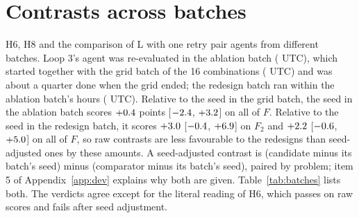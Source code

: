 \section{Contrasts across batches}\label{app:batches}
H6, H8 and the comparison of L with one retry pair agents from different batches. Loop 3's agent was re-evaluated in the
ablation batch (\vbtAbl{} UTC), which started together with the grid batch of the 16 combinations (\vbtGrid{} UTC) and
was about a quarter done when the grid ended; the redesign batch ran within the ablation batch's hours (\vbtRed{} UTC).
Relative to the seed in the grid batch, the seed in the ablation batch scores $+0.4$ points [$-2.4$,
$+3.2$] on all of $F$. Relative to the seed in the redesign batch, it scores $+3.0$
[$-0.4$, $+6.9$] on $F_2$ and $+2.2$ [$-0.6$, $+5.0$] on all of $F$, so
raw contrasts are less favourable to the redesigns than seed-adjusted ones by these amounts. A seed-adjusted contrast is
(candidate minus its batch's seed) minus (comparator minus its batch's seed), paired by problem; item 5 of
Appendix~\ref{app:dev} explains why both are given. Table~\ref{tab:batches} lists both. The verdicts agree except for the
literal reading of H6, which passes on raw scores and fails after seed adjustment.

